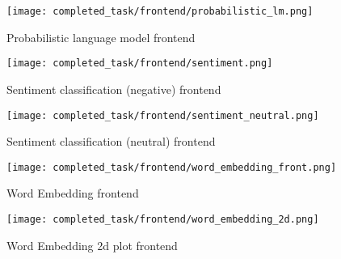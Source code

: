 \begin{figure}[H]
	\centering
	\texttt{[image: completed\_task/frontend/probabilistic\_lm.png]}
	\caption{Probabilistic language model frontend}
	\label{fig:Probabilistic language model frontend}
\end{figure}

\begin{figure}[H]
	\centering
	\texttt{[image: completed\_task/frontend/sentiment.png]}
	\caption{Sentiment classification (negative) frontend}
	\label{fig:Sentiment classification  (negative) frontend}
\end{figure}

\begin{figure}[H]
	\centering
	\texttt{[image: completed\_task/frontend/sentiment\_neutral.png]}
	\caption{Sentiment classification (neutral) frontend}
	\label{fig:Sentiment classification (neutral) frontend}
\end{figure}

\begin{figure}[H]
	\centering
	\texttt{[image: completed\_task/frontend/word\_embedding\_front.png]}
	\caption{Word Embedding frontend}
	\label{fig:Word Embedding frontend}
\end{figure}

\begin{figure}[H]
	\centering
	\texttt{[image: completed\_task/frontend/word\_embedding\_2d.png]}
	\caption{Word Embedding 2d plot frontend}
	\label{fig:Word Embedding 2d plot frontend}
\end{figure}




